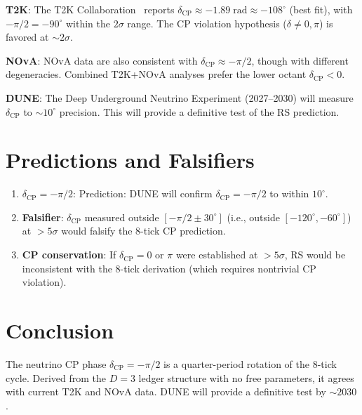 \documentclass[12pt,a4paper]{article}
\theoremstyle{definition}
\theoremstyle{remark}
\begin{document}
\textbf{T2K}: The T2K Collaboration~\cite{T2K} reports
$\delta_{\mathrm{CP}} \approx -1.89\;\mathrm{rad} \approx
-108^\circ$ (best fit), with $-\pi/2 = -90^\circ$ within the
$2\sigma$ range.  The CP violation hypothesis ($\delta \neq 0,
\pi$) is favored at $\sim 2\sigma$.

\textbf{NOvA}: NOvA data are also consistent with
$\delta_{\mathrm{CP}} \approx -\pi/2$, though with different
degeneracies.  Combined T2K+NOvA analyses prefer the lower octant
$\delta_{\mathrm{CP}} < 0$.

\textbf{DUNE}: The Deep Underground Neutrino Experiment
(2027--2030) will measure $\delta_{\mathrm{CP}}$ to $\sim 10^\circ$
precision.  This will provide a definitive test of the RS prediction.

\section{Predictions and Falsifiers}
\label{sec:predictions}

\begin{enumerate}[label=(\roman*)]
\item \textbf{$\delta_{\mathrm{CP}} = -\pi/2$}: Prediction: DUNE
will confirm $\delta_{\mathrm{CP}} = -\pi/2$ to within $10^\circ$.

\item \textbf{Falsifier}: $\delta_{\mathrm{CP}}$ measured outside
$[-\pi/2 \pm 30^\circ]$ (i.e., outside $[-120^\circ, -60^\circ]$)
at $> 5\sigma$ would falsify the 8-tick CP prediction.

\item \textbf{CP conservation}: If $\delta_{\mathrm{CP}} = 0$ or
$\pi$ were established at $> 5\sigma$, RS would be inconsistent
with the 8-tick derivation (which requires nontrivial CP violation).
\end{enumerate}

\section{Conclusion}
\label{sec:conclusion}

The neutrino CP phase $\delta_{\mathrm{CP}} = -\pi/2$ is a
quarter-period rotation of the 8-tick cycle.  Derived from the
$D = 3$ ledger structure with no free parameters, it agrees with
current T2K and NOvA data.  DUNE will provide a definitive test
by $\sim 2030$.
\end{document}
